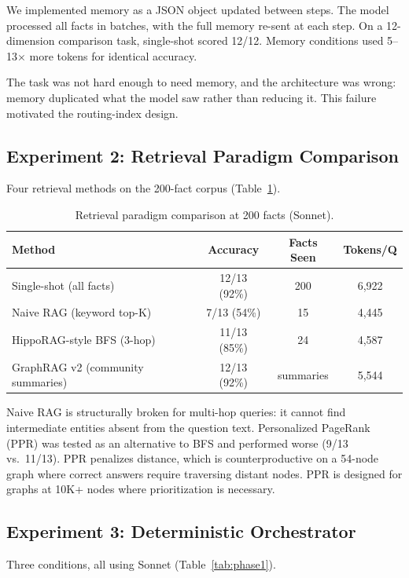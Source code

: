 \documentclass[11pt,a4paper]{article}
\begin{document}
We implemented memory as a JSON object updated between steps. The model processed all facts in batches, with the full memory re-sent at each step. On a 12-dimension comparison task, single-shot scored 12/12. Memory conditions used 5--13$\times$ more tokens for identical accuracy.

The task was not hard enough to need memory, and the architecture was wrong: memory duplicated what the model saw rather than reducing it. This failure motivated the routing-index design.

\subsection{Experiment 2: Retrieval Paradigm Comparison}

Four retrieval methods on the 200-fact corpus (Table~\ref{tab:rag}).

\begin{table}[h]
\centering
\caption{Retrieval paradigm comparison at 200 facts (Sonnet).}
\label{tab:rag}
\begin{tabular}{@{}lccc@{}}
\toprule
Method & Accuracy & Facts Seen & Tokens/Q \\
\midrule
Single-shot (all facts) & 12/13 (92\%) & 200 & 6{,}922 \\
Naive RAG (keyword top-K) & 7/13 (54\%) & 15 & 4{,}445 \\
HippoRAG-style BFS (3-hop) & 11/13 (85\%) & 24 & 4{,}587 \\
GraphRAG v2 (community summaries) & 12/13 (92\%) & summaries & 5{,}544 \\
\bottomrule
\end{tabular}
\end{table}

Naive RAG is structurally broken for multi-hop queries: it cannot find intermediate entities absent from the question text. Personalized PageRank (PPR) was tested as an alternative to BFS and performed worse (9/13 vs.\ 11/13). PPR penalizes distance, which is counterproductive on a 54-node graph where correct answers require traversing distant nodes. PPR is designed for graphs at 10K+ nodes where prioritization is necessary.

\subsection{Experiment 3: Deterministic Orchestrator}

Three conditions, all using Sonnet (Table~\ref{tab:phase1}).
\end{document}
